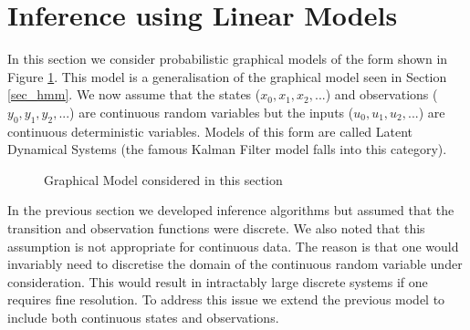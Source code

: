 \section{Inference using Linear Models}
\label{sec_inf_lin_mods}
In this section we consider probabilistic graphical models of the form shown in Figure \ref{fig_linmod2}. This model is a generalisation of the graphical model seen in Section \ref{sec_hmm}. We now assume that the states ($x_0,x_1,x_2,...$) and observations ($y_0,y_1,y_2,...$) are continuous random variables but the inputs ($u_0,u_1,u_2,...$) are continuous deterministic variables. Models of this form are called Latent Dynamical Systems (the famous Kalman Filter model falls into this category).
\begin{figure}[H] 
\centering
{}
\caption{Graphical Model considered in this section}
\label{fig_linmod2}
\end{figure}
In the previous section we developed inference algorithms but assumed that the transition and observation functions were discrete. We also noted that this assumption is not appropriate for continuous data. The reason is that one would invariably need to discretise the domain of the continuous random variable under consideration. This would result in intractably large discrete systems if one requires fine resolution. To address this issue we extend the previous model to include both continuous states and observations. 

